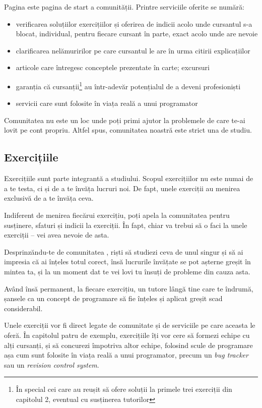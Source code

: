 Pagina {\phpro} este pagina de start a comunității. Printre serviciile oferite se numără:
\begin{itemize}
    \item verificarea soluțiilor exercițiilor și oferirea de indicii acolo unde cursantul s-a blocat, individual,
pentru fiecare cursant în parte, exact acolo unde are nevoie
    \item clarificarea nelămuririlor pe care cursantul le are în urma citirii explicațiilor
    \item articole care întregesc conceptele prezentate în carte; excursuri
    \item garanția că cursanții\footnote{În special cei care au reușit
să ofere soluții la primele trei exerciții din capitolul 2, eventual cu susținerea
tutorilor} au într-adevăr potențialul de a deveni profesioniști
    \item servicii care sunt folosite în viața reală a unui programator
\end{itemize}

Comunitatea {\phpro} nu este un loc unde poți primi ajutor la
problemele de care te-ai lovit pe cont propriu. Altfel spus, comunitatea
noastră este strict una de studiu.

{}
\subsection*{Exercițiile}

Exercițiile sunt parte integrantă a studiului. Scopul exercițiilor nu
este numai de a te testa, ci și de a te învăța lucruri noi. De fapt,
unele exerciții au menirea exclusivă de a te învăța ceva.

Indiferent de menirea fiecărui exercițiu, poți apela la comunitatea
{\phpro} pentru susținere, sfaturi și indicii la exerciții. În fapt,
chiar va trebui să o faci la unele exerciții -- vei avea nevoie de asta.

Desprinzăndu-te de comunitatea \phpro, riști să studiezi ceva de unul
singur și să ai impresia că ai înțeles totul corect, însă lucrurile învățate
se pot așterne greșit în mintea ta, și la un moment dat te vei lovi
tu însuți de probleme din cauza asta.

Având însă permanent, la fiecare exercițiu, un tutore lângă tine care te
îndrumă, șansele ca un concept de programare să fie înțeles și aplicat
greșit scad considerabil.

Unele exerciții vor fi direct legate de comunitate și de serviciile pe care
aceasta le oferă. În capitolul patru de exemplu, exercițiile îți vor 
cere să formezi echipe cu alți cursanți, și să concurezi împotriva altor echipe, folosind
scule de programare așa cum sunt folosite în viața reală a unui programator,
precum un \textsl{bug tracker} sau un \textsl{revision control system}.

